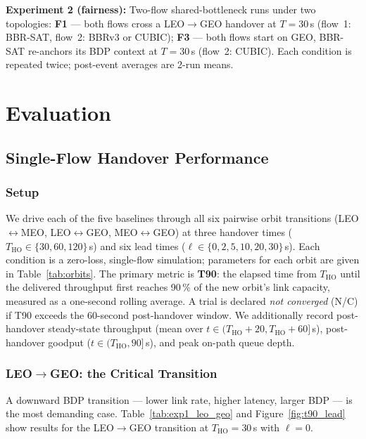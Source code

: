 \documentclass[conference]{IEEEtran}
\begin{document}
\textbf{Experiment 2 (fairness):}
Two-flow shared-bottleneck runs under two topologies:
\textbf{F1} --- both flows cross a LEO$\to$GEO handover at $T=30$\,s
(flow~1: BBR-SAT, flow~2: BBRv3 or CUBIC);
\textbf{F3} --- both flows start on GEO, BBR-SAT re-anchors its BDP
context at $T=30$\,s (flow~2: CUBIC).
Each condition is repeated twice; post-event averages are 2-run means.

\section{Evaluation}
\label{sec:evaluation}

\subsection{Single-Flow Handover Performance}
\label{sec:exp1}

\subsubsection{Setup}

We drive each of the five baselines through all six pairwise orbit
transitions (LEO$\leftrightarrow$MEO, LEO$\leftrightarrow$GEO,
MEO$\leftrightarrow$GEO) at three handover times
($T_\mathrm{HO} \in \{30, 60, 120\}$\,s) and six lead times
($\ell \in \{0, 2, 5, 10, 20, 30\}$\,s).
Each condition is a zero-loss, single-flow simulation; parameters for each
orbit are given in Table~\ref{tab:orbits}.
The primary metric is \textbf{T90}: the elapsed time from
$T_\mathrm{HO}$ until the delivered throughput first reaches
90\,\% of the new orbit's link capacity, measured as a one-second rolling
average.
A trial is declared \emph{not converged} (N/C) if T90 exceeds the
60-second post-handover window.
We additionally record post-handover steady-state throughput
(mean over $t \in (T_\mathrm{HO}+20, T_\mathrm{HO}+60]$\,s),
post-handover goodput ($t \in (T_\mathrm{HO}, 90]$\,s),
and peak on-path queue depth.

\subsubsection{LEO$\to$GEO: the Critical Transition}

A downward BDP transition --- lower link rate, higher latency, larger BDP
--- is the most demanding case.
Table~\ref{tab:exp1_leo_geo} and Figure~\ref{fig:t90_lead} show results
for the LEO$\to$GEO transition at $T_\mathrm{HO} = 30$\,s with $\ell = 0$.
\end{document}
